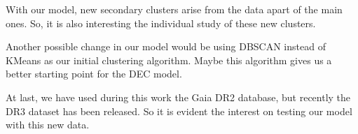 \documentclass[11pt, a4paper, english]{book}
\begin{document}
With our model, new secondary clusters arise from the data apart of the main ones.
So, it is also interesting the individual study of these new clusters.

Another possible change in our model would be using DBSCAN instead of KMeans as our initial clustering algorithm.
Maybe this algorithm gives us a better starting point for the DEC model.

At last, we have used during this work the Gaia DR2 database, but recently the DR3 dataset has been released.
So it is evident the interest on testing our model with this new data.

\newpage



\appendix

\end{document}
